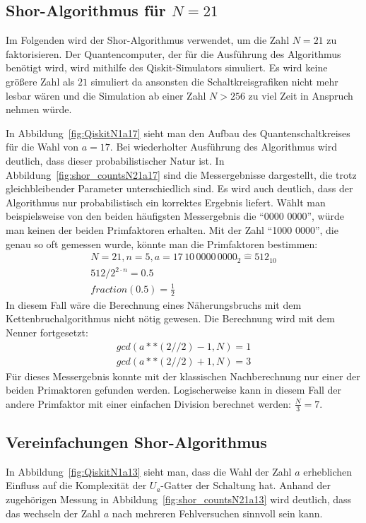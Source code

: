 \documentclass[a4paper,journal]{IEEEtran}
\begin{document}
\subsection{Shor-Algorithmus für \(N = 21\)}
Im Folgenden wird der Shor-Algorithmus verwendet,
um die Zahl \(N = 21\) zu faktorisieren.
Der Quantencomputer, der für die Ausführung des Algorithmus benötigt wird,
wird mithilfe des Qiskit-Simulators simuliert.
Es wird keine größere Zahl als \(21\) simuliert
da ansonsten die Schaltkreisgrafiken nicht mehr lesbar wären und
die Simulation ab einer Zahl \(N > 256\) zu viel Zeit in Anspruch nehmen würde.

In Abbildung~\ref{fig:QiskitN1a17} sieht man den Aufbau des Quantenschaltkreises
für die Wahl von \(a = 17\).
Bei wiederholter Ausführung des Algorithmus wird deutlich,
dass dieser probabilistischer Natur ist.
In Abbildung~\ref{fig:shor_countsN21a17} sind die Messergebnisse dargestellt,
die trotz gleichbleibender Parameter unterschiedlich sind.
Es wird auch deutlich, dass der Algorithmus nur probabilistisch ein korrektes Ergebnis liefert.
Wählt man beispielsweise von den beiden häufigsten Messergebnis die "`0000 0000"',
würde man keinen der beiden Primfaktoren erhalten.
Mit der Zahl "`1000 0000"', die  genau so oft gemessen wurde, könnte man die Primfaktoren bestimmen:
\begin{equation*}
\begin{split}
  N = 21,
  n = 5,
  a = 17\,10\,0000\,0000_2 \widehat{=} 512_{10}\\
  512/2^{2\cdot n} = 0.5\\
  fraction(0.5) = \frac{1}{2}
\end{split}
\end{equation*}
In diesem Fall wäre die Berechnung eines Näherungsbruchs mit dem Kettenbruchalgorithmus nicht nötig gewesen.
Die Berechnung wird mit dem Nenner fortgesetzt:
\begin{equation*}
\begin{split}
  gcd(a**(2//2)-1, N) = 1\\
  gcd(a**(2//2)+1, N) = 3
\end{split}
\end{equation*}
Für dieses Messergebnis konnte mit der klassischen Nachberechnung
nur einer der beiden Primaktoren gefunden werden.
Logischerweise kann in diesem Fall der andere Primfaktor mit einer einfachen Division berechnet werden:
\(\frac{N}{3} = 7\).

\subsection{Vereinfachungen Shor-Algorithmus}
In Abbildung~\ref{fig:QiskitN1a13} sieht man,
dass die Wahl der Zahl \(a\) erheblichen Einfluss auf die Komplexität der \(U_a\)-Gatter der Schaltung hat.
Anhand der zugehörigen Messung in Abbildung~\ref{fig:shor_countsN21a13} wird deutlich,
dass das wechseln der Zahl \(a\) nach mehreren Fehlversuchen sinnvoll sein kann.
\end{document}
